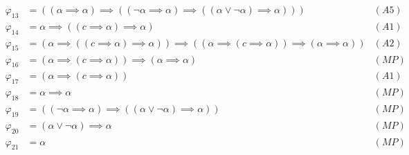 \begin{sol}
\begin{align*}
        \varphi_{13} & = ((\alpha\implies\alpha)\implies((\neg\alpha\implies\alpha)\implies((\alpha\vee\neg\alpha)\implies\alpha)))                             & (A5)  \\
        \varphi_{14} & = \alpha\implies((c\implies\alpha)\implies\alpha)                                                                                        & (A1)  \\
        \varphi_{15} & = (\alpha\implies((c\implies\alpha)\implies\alpha))\implies((\alpha\implies(c\implies\alpha))\implies(\alpha\implies\alpha))             & (A2)  \\
        \varphi_{16} & = (\alpha\implies(c\implies\alpha))\implies(\alpha\implies\alpha)                                                                        & (MP)  \\
        \varphi_{17} & = (\alpha\implies(c\implies\alpha))                                                                                                      & (A1)  \\
        \varphi_{18} & = \alpha\implies\alpha                                                                                                                   & (MP)  \\
        \varphi_{19} & = ((\neg\alpha\implies\alpha)\implies((\alpha\vee\neg\alpha)\implies\alpha))                                                             & (MP)  \\
        \varphi_{20} & = (\alpha\vee\neg\alpha)\implies\alpha                                                                                                   & (MP)  \\
        \varphi_{21} & = \alpha                                                                                                                                 & (MP)
    \end{align*}
\end{sol}
